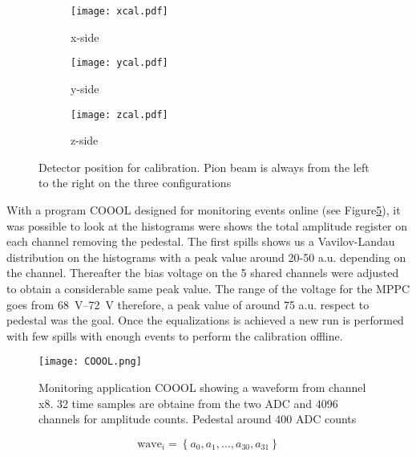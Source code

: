 \begin{figure}[ht]
	\hspace*{\fill}
	\begin{subfigure}[b]{0.45\textwidth}
	\centering
	\texttt{[image: xcal.pdf]}
	\caption{x-side}\label{mipx}
	\end{subfigure}
	\begin{subfigure}[b]{0.29\textwidth}
	\centering
	\texttt{[image: ycal.pdf]}
	\caption{y-side}\label{mipy}
	\end{subfigure}
	\begin{subfigure}[b]{0.14\textwidth}
	\centering
	\texttt{[image: zcal.pdf]}
	\caption{z-side}\label{mipz}
	\end{subfigure}\hspace*{\fill}
	\caption{Detector position for calibration. Pion beam is always from the left to the right on the three configurations}\label{mip}
\end{figure}

With a program COOOL designed for monitoring events online (see Figure\ref{coool}), it was possible to look at the histograms were shows the total
amplitude register on each channel removing the pedestal. The first spills shows us a Vavilov-Landau distribution on the
histograms with a peak value around 20-50 a.u. depending on the channel. Thereafter the bias voltage on the 5 shared channels
were adjusted to obtain a considerable same peak value. The range of the voltage for the MPPC goes from
\SIrange{68}{72}{V} therefore, a peak value of around 75 a.u. respect to pedestal was the goal. Once the equalizations is achieved a new run
is performed with few spills with enough events to perform the calibration offline.\par 

\begin{figure}[ht]
	\hspace*{\fill}
	\centering
	\texttt{[image: COOOL.png]}
	\hspace*{\fill}
	\caption{Monitoring application COOOL showing a waveform from channel x8. 32 time samples are obtaine from the two
	ADC and 4096 channels for amplitude counts. Pedestal around 400 ADC counts}\label{coool}
\end{figure}

\begin{equation}\label{wave}
\mathrm{wave}_{i}=\left\{a_0,a_1,\dotsc,a_{30},a_{31}\right\}
\end{equation}

